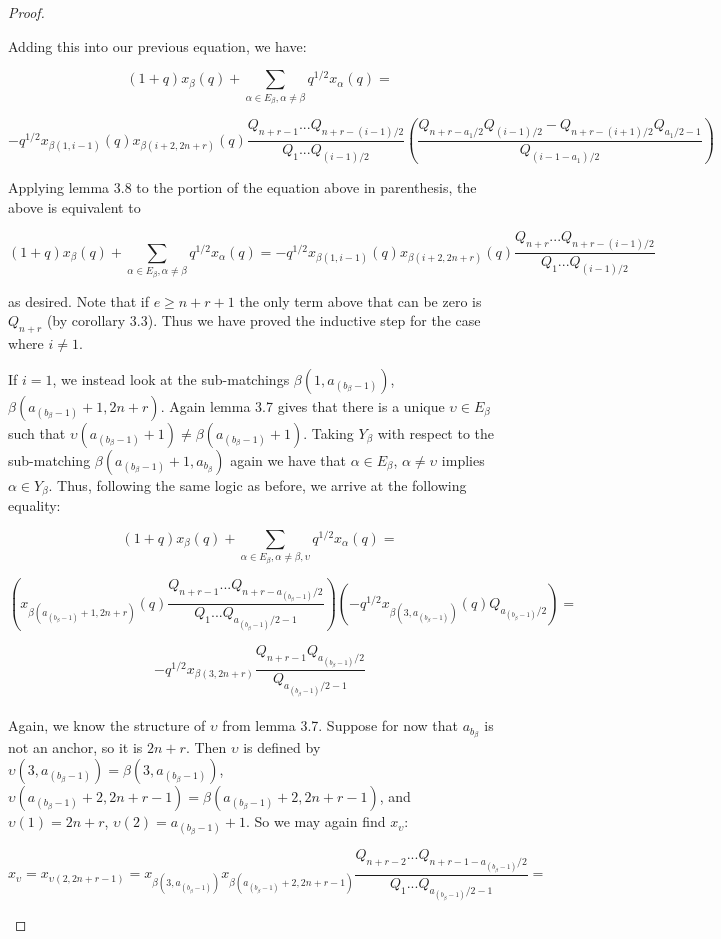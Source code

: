 \documentclass{amsart}
\begin{document}
\begin{proof}
\begin{enumerate}
	Adding this into our previous equation, we have:
	
	$$(1+q)x_\beta(q)+\sum_{\alpha\in E_\beta,\alpha\not=\beta}q^{1/2}x_\alpha(q)=$$
	
	$$-q^{1/2}x_{\beta(1,i-1)}(q)x_{\beta(i+2,2n+r)}(q)\frac{Q_{n+r-1}...Q_{n+r-(i-1)/2}}{Q_1...Q_{(i-1)/2}}(\frac{Q_{n+r-a_1/2}Q_{(i-1)/2}-Q_{n+r-(i+1)/2}Q_{a_1/2-1}}{Q_{(i-1-a_1)/2}})$$
	
	Applying lemma 3.8 to the portion of the equation above in parenthesis, the above is equivalent to
	
	$$(1+q)x_\beta(q)+\sum_{\alpha\in E_\beta,\alpha\not=\beta}q^{1/2}x_\alpha(q)=-q^{1/2}x_{\beta(1,i-1)}(q)x_{\beta(i+2,2n+r)}(q)\frac{Q_{n+r}...Q_{n+r-(i-1)/2}}{Q_1...Q_{(i-1)/2}}$$
	
	as desired. Note that if $e\geq n+r+1$ the only term above that can be zero is $Q_{n+r}$ (by corollary 3.3). Thus we have proved the inductive step for the case where $i\not=1$.
	
	\vspace{5mm}
	If $i=1$, we instead look at the sub-matchings $\beta(1,a_{(b_\beta-1)})$, $\beta(a_{(b_\beta-1)}+1,2n+r)$. Again lemma 3.7 gives that there is a unique $\upsilon\in E_\beta$ such that $\upsilon(a_{(b_\beta-1)}+1)\not=\beta(a_{(b_\beta-1)}+1)$. Taking $Y_\beta$ with respect to the sub-matching $\beta(a_{(b_\beta-1)}+1,a_{b_\beta})$ again we have that $\alpha\in E_\beta$, $\alpha\not=\upsilon$ implies $\alpha\in Y_\beta$. Thus, following the same logic as before, we arrive at the following equality:
	
	$$(1+q)x_\beta(q)+\sum_{\alpha\in E_\beta,\alpha\not=\beta,\upsilon}q^{1/2}x_\alpha(q)=$$
	
	$$(x_{\beta(a_{(b_\beta-1)}+1,2n+r)}(q)\frac{Q_{n+r-1}...Q_{n+r-a_{(b_\beta-1)}/2}}{Q_1...Q_{a_{(b_\beta-1)}/2-1}})(-q^{1/2}x_{\beta(3,a_{(b_\beta-1)})}(q)Q_{a_{(b_\beta-1)}/2})=$$
	
	$$-q^{1/2}x_{\beta(3,2n+r)}\frac{Q_{n+r-1}Q_{a_{(b_\beta-1)}/2}}{Q_{a_{(b_\beta-1)}/2-1}}$$
	\\
	
	Again, we know the structure of $\upsilon$ from lemma 3.7. Suppose for now that $a_{b_\beta}$ is not an anchor, so it is $2n+r$. Then $\upsilon$ is defined by $\upsilon(3,a_{(b_\beta-1)})=\beta(3,a_{(b_\beta-1)})$, $\upsilon(a_{(b_\beta-1)}+2,2n+r-1)=\beta(a_{(b_\beta-1)}+2,2n+r-1)$, and $\upsilon(1)=2n+r$, $\upsilon(2)=a_{(b_\beta-1)}+1$. So we may again find $x_\upsilon$:
	
	$$x_\upsilon=x_{\upsilon(2,2n+r-1)}=x_{\beta(3,a_{(b_\beta-1)})}x_{\beta(a_{(b_\beta-1)}+2,2n+r-1)}\frac{Q_{n+r-2}...Q_{n+r-1-a_{(b_\beta-1)}/2}}{Q_1...Q_{a_{(b_\beta-1)}/2-1}}=$$
	

\end{enumerate}
\end{proof}
\end{document}

